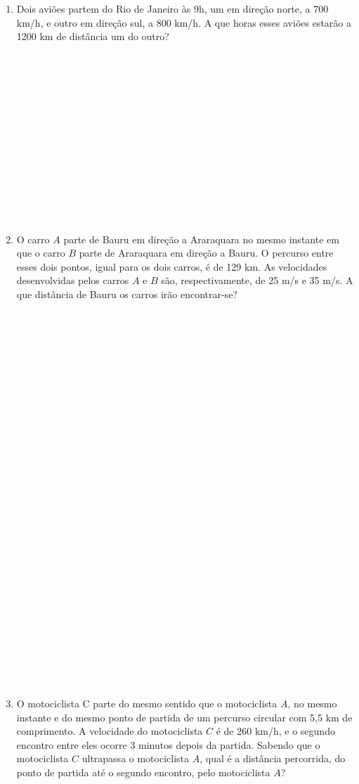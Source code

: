 \documentclass[a4paper,14pt]{article}
\begin{document}
\begin{multicols}{2}
\begin{enumerate}
    	    \item Dois aviões partem do Rio de Janeiro às 9h, um em direção norte, a 700 km/h, e outro em direção sul, a 800 km/h. A que horas esses aviões estarão a 1200 km de distância um do outro?  \\\\\\\\\\\\\\\\\\\\\\\\\\\\
    	    \item O carro $A$ parte de Bauru em direção a Araraquara no mesmo instante em que o carro $B$ parte de Araraquara em direção a Bauru. O percurso entre esses dois pontos, igual para os dois carros, é de 129 km. As velocidades desenvolvidas pelos carros $A$ e $B$ são, respectivamente, de 25 m/s e 35 m/s. A que distância de Bauru os carros irão encontrar-se?  \\\\\\\\\\\\\\\\\\\\\\\\\\\\\\\\\\\\\\\\\\\\\\\\\\\\\\\\\\
    	    \item O motociclista C parte do mesmo sentido que o motociclista $A$, no mesmo instante e do mesmo ponto de partida de um percurso circular com 5,5 km de comprimento. A velocidade do motociclista $C$ é de 260 km/h, e o segundo encontro entre eles ocorre 3 minutos depois da partida. Sabendo que o motociclista $C$ ultrapassa o motociclista $A$, qual é a distância percorrida, do ponto de partida até o segundo encontro, pelo motociclista $A$?

\end{enumerate}
\end{multicols}
\end{document}
